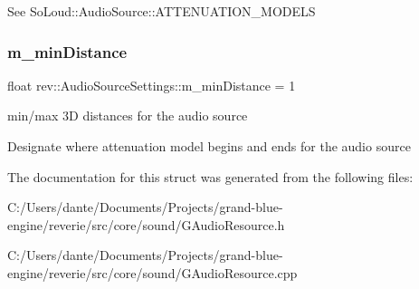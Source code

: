 See So\+Loud\+::\+Audio\+Source\+::\+A\+T\+T\+E\+N\+U\+A\+T\+I\+O\+N\+\_\+\+M\+O\+D\+E\+LS \mbox{\label{structrev_1_1_audio_source_settings_ab5ecfddf3e20a49f72d98a79eb2048ad}} 
\subsubsection{\texorpdfstring{m\_minDistance}{m\_minDistance}}
{\footnotesize\ttfamily float rev\+::\+Audio\+Source\+Settings\+::m\+\_\+min\+Distance = 1}



min/max 3D distances for the audio source 

Designate where attenuation model begins and ends for the audio source 

The documentation for this struct was generated from the following files\+:\begin{DoxyCompactItemize}
\item 
C\+:/\+Users/dante/\+Documents/\+Projects/grand-\/blue-\/engine/reverie/src/core/sound/G\+Audio\+Resource.\+h\item 
C\+:/\+Users/dante/\+Documents/\+Projects/grand-\/blue-\/engine/reverie/src/core/sound/G\+Audio\+Resource.\+cpp\end{DoxyCompactItemize}
